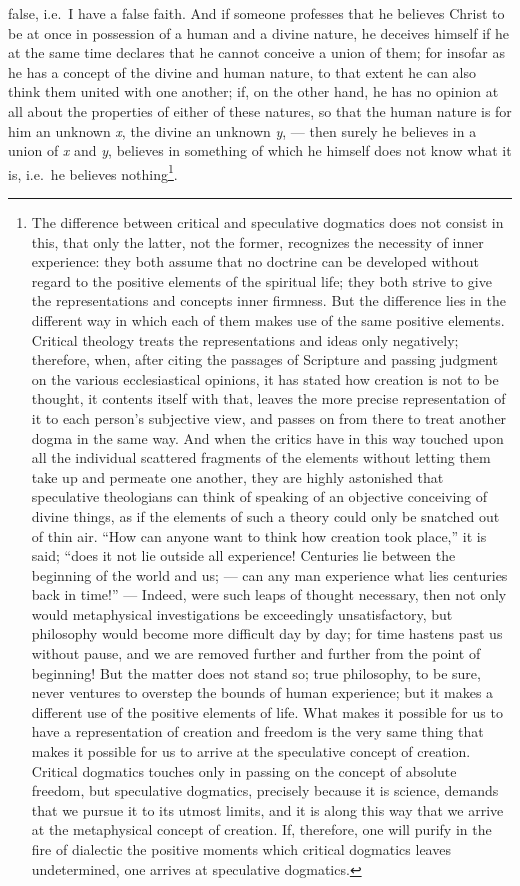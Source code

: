 \documentclass[12pt]{book}
\begin{document}
false, i.e.\ I have a false faith. And if someone professes that he believes
Christ to be at once in possession of a human and a divine nature, he deceives
himself if he at the same time declares that he cannot conceive a union of
them; for insofar as he has a concept of the divine and human nature, to that
extent he can also think them united with one another; if, on the other hand,
he has no opinion at all about the properties of either of these natures, so
that the human nature is for him an unknown \textit{x}, the divine an unknown
\textit{y}, --- then surely he believes in a union of \textit{x} and
\textit{y}, believes in something of which he himself does not know what it
is, i.e.\ he believes nothing\footnote{The difference between critical and
speculative dogmatics does not consist in this, that only the latter, not the
former, recognizes the necessity of inner experience: they both assume that no
doctrine can be developed without regard to the positive elements of the
spiritual life; they both strive to give the representations and concepts
inner firmness. But the difference lies in the different way in which each of
them makes use of the same positive elements. Critical theology treats the
representations and ideas only negatively; therefore, when, after citing the
passages of Scripture and passing judgment on the various ecclesiastical
opinions, it has stated how creation is not to be thought, it contents
itself with that, leaves the more precise representation of it to each
person's subjective view, and passes on from there to treat another dogma in
the same way. And when the critics have in this way touched upon all the
individual scattered fragments of the elements without letting them take up
and permeate one another, they are highly astonished that speculative
theologians can think of speaking of an objective conceiving of divine things,
as if the elements of such a theory could only be snatched out of thin air.
``How can anyone want to think how creation took place,'' it is said; ``does
it not lie outside all experience! Centuries lie between the beginning of the
world and us; --- can any man experience what lies centuries back in time!''
--- Indeed, were such leaps of thought necessary, then not only would
metaphysical investigations be exceedingly unsatisfactory, but philosophy
would become more difficult day by day; for time hastens past us without
pause, and we are removed further and further from the point of beginning! But
the matter does not stand so; true philosophy, to be sure, never ventures to
overstep the bounds of human experience; but it makes a different use of the
positive elements of life. What makes it possible for us to have a
representation of creation and freedom is the very same thing that makes it
possible for us to arrive at the speculative concept of creation. Critical
dogmatics touches only in passing on the concept of absolute freedom, but
speculative dogmatics, precisely because it is science, demands that we pursue
it to its utmost limits, and it is along this way that we arrive at the
metaphysical concept of creation. If, therefore, one will purify in the fire of
dialectic the positive moments which critical dogmatics leaves undetermined,
one arrives at speculative dogmatics.}.
\end{document}
